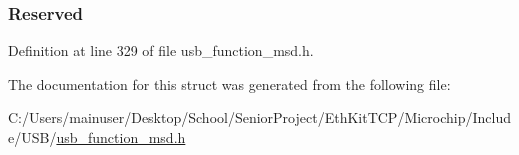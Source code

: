 \subsubsection[{Reserved}]{ Reserved}\label{struct_request_sense_c_b_a3aef54172eb78efe737c8eb7b0093d3c}


Definition at line 329 of file usb\+\_\+function\+\_\+msd.\+h.



The documentation for this struct was generated from the following file\+:\begin{DoxyCompactItemize}
\item 
C\+:/\+Users/mainuser/\+Desktop/\+School/\+Senior\+Project/\+Eth\+Kit\+T\+C\+P/\+Microchip/\+Include/\+U\+S\+B/\hyperlink{usb__function__msd_8h}{usb\+\_\+function\+\_\+msd.\+h}\end{DoxyCompactItemize}
